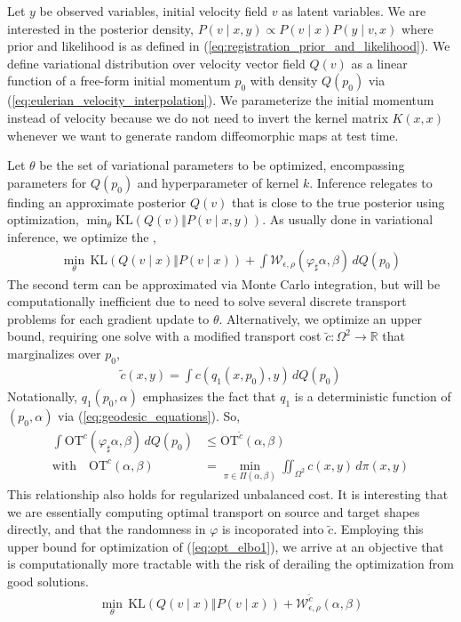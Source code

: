 \documentclass{6838publ}
\newcommand\sW{\ensuremath{\mathcal{W}}}
\newcommand\R{\ensuremath{\mathbb{R}}} %
\begin{document}
Let $y$ be observed variables, initial velocity field $v$ as latent variables. We are interested in the posterior density, $P(v\mid x, y) \propto P(v\mid x) P(y\mid v,x)$ where prior and likelihood is as defined in (\ref{eq:registration_prior_and_likelihood}). We define variational distribution over velocity vector field $Q(v)$ as a linear function of a free-form initial momentum $p_0$ with density $Q(p_0)$ via (\ref{eq:eulerian_velocity_interpolation}). We parameterize the initial momentum instead of velocity because we do not need to invert the kernel matrix $K(x,x)$ whenever we want to generate random diffeomorphic maps at test time. 

Let $\theta$ be the set of variational parameters to be optimized, encompassing parameters for $Q(p_0)$ and hyperparameter of kernel $k$. Inference relegates to finding an approximate posterior $Q(v)$ that is close to the true posterior using optimization, $\min_{\theta} \text{KL}(Q(v)\Vert P(v\mid x, y))$. As usually done in variational inference, we optimize the ,
\begin{align}
    \min_{\theta}\,
        \text{KL}(Q(v\mid x)\Vert P(v\mid x)) + \int \sW_{\epsilon,\rho}(\varphi_\sharp\alpha,\beta) \, dQ(p_0)
    \label{eq:opt_elbo1}
\end{align}
The second term can be approximated via Monte Carlo integration, but will be computationally inefficient due to need to solve several discrete transport problems for each gradient update to $\theta$. Alternatively, we optimize an upper bound, requiring one solve with a modified transport cost $\widetilde{c}: \Omega^2\to\R$ that marginalizes over $p_0$,
\begin{align}
    \widetilde{c}(x,y)
        = \int c(q_1(x,p_0),y)\, dQ(p_0)
    \label{eq:cost_marginalize_momentum}
\end{align}
Notationally, $q_1(p_0,\alpha)$ emphasizes the fact that $q_1$ is a deterministic function of $(p_0,\alpha)$ via (\ref{eq:geodesic_equations}). So,
\begin{align}
    \int \text{OT}^c(\varphi_\sharp\alpha,\beta) \, dQ(p_0)
        &\leq \text{OT}^{\widetilde{c}}(\alpha,\beta) \\
    \text{with}\quad \text{OT}^c(\alpha,\beta)
        &= \min_{\pi\in\Pi(\alpha,\beta)} \iint_{\Omega^2} c(x, y) \, d\pi(x,y)
\end{align}
This relationship also holds for regularized unbalanced cost. It is interesting that we are essentially computing optimal transport on source and target shapes directly, and that the randomness in $\varphi$ is incoporated into $\widetilde{c}$. Employing this upper bound for optimization of (\ref{eq:opt_elbo1}), we arrive at an objective that is computationally more tractable with the risk of derailing the optimization from good solutions.
\begin{align}
    \min_{\theta}\,
        \text{KL}(Q(v\mid x)\Vert P(v\mid x)) + \sW_{\epsilon,\rho}^{\widetilde{c}}(\alpha,\beta)
    \label{eq:opt_elbo2}
\end{align}
\end{document}
